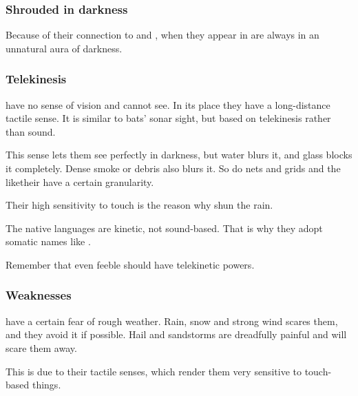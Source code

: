 \subsubsection{Shrouded in darkness}
Because of their connection to \Nyx{} and \Erebos, when they appear in \Miith{} \banes{} are always  in an unnatural aura of darkness. 






\subsubsection{Telekinesis}
\Banes{} have no sense of vision and cannot see. 
In its place they have a long-distance tactile sense. 
It is similar to bats' sonar sight, but based on telekinesis rather than sound. 

This sense lets them see perfectly in darkness, but water blurs it, and glass blocks it completely. 
Dense smoke or debris also blurs it. 
So do nets and grids and the like\dash their  have a certain granularity. 

Their high sensitivity to touch is the reason why \banes{} shun the rain. 

The \banes{} native languages are kinetic, not sound-based. 
That is why they adopt somatic names like \quo{\Daggerrain}. 

Remember that even feeble \lesserbanes{} should have telekinetic powers. 





\subsubsection{Weaknesses}
\Banes{} have a certain fear of rough weather. 
Rain, snow and strong wind scares them, and they avoid it if possible. 
Hail and sandstorms are dreadfully painful and will scare them away. 

This is due to their tactile senses, which render them very sensitive to touch-based things. 









